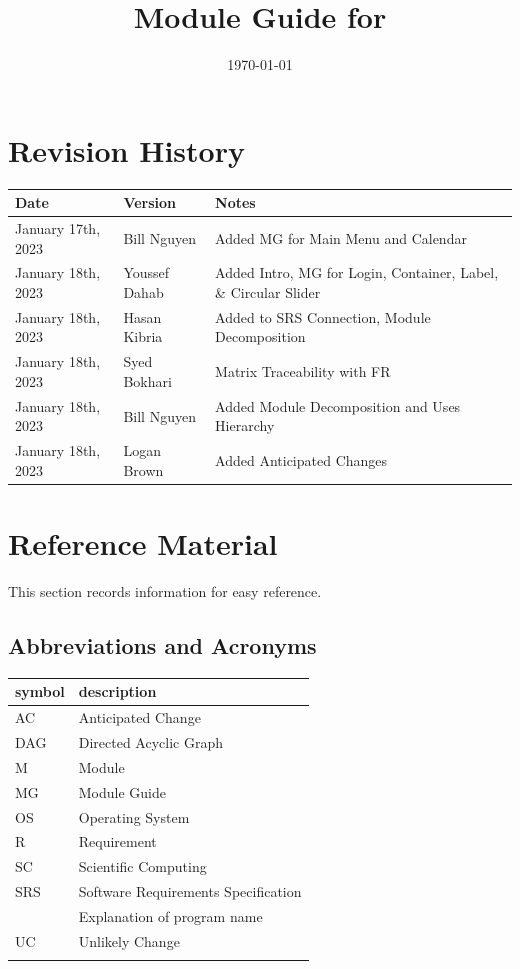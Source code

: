 \documentclass[12pt, titlepage]{article}
\begin{document}
\title{Module Guide for \progname{}} 
\author{\authname}
\date{\today}

\maketitle


\section{Revision History}

\begin{tabularx}{\textwidth}{p{3cm}p{2cm}X}
	\toprule {\bf Date} & {\bf Version} & {\bf Notes}\\
	\midrule
	January 17th, 2023 & Bill Nguyen  & Added MG for Main Menu and Calendar\\
	January 18th, 2023 & Youssef Dahab & Added Intro, MG for Login, Container, Label, \& Circular Slider\\
	January 18th, 2023 & Hasan Kibria & Added to SRS Connection, Module Decomposition\\	
	January 18th, 2023 & Syed Bokhari & Matrix Traceability with FR\\	
	January 18th, 2023 & Bill Nguyen  & Added Module Decomposition and Uses Hierarchy\\
	January 18th, 2023 & Logan Brown  & Added Anticipated Changes\\
\bottomrule
\end{tabularx}

\newpage

\section{Reference Material}

This section records information for easy reference.

\subsection{Abbreviations and Acronyms}

\renewcommand{\arraystretch}{1.2}
\begin{tabular}{l l} 
	\toprule		
	\textbf{symbol} & \textbf{description}\\
	\midrule 
	AC & Anticipated Change\\
	DAG & Directed Acyclic Graph \\
	M & Module \\
	MG & Module Guide \\
	OS & Operating System \\
	R & Requirement\\
	SC & Scientific Computing \\
	SRS & Software Requirements Specification\\
	\progname & Explanation of program name\\
	UC & Unlikely Change \\
	\wss{etc.} & \wss{...}\\
	\bottomrule
\end{tabular}\\
\end{document}

